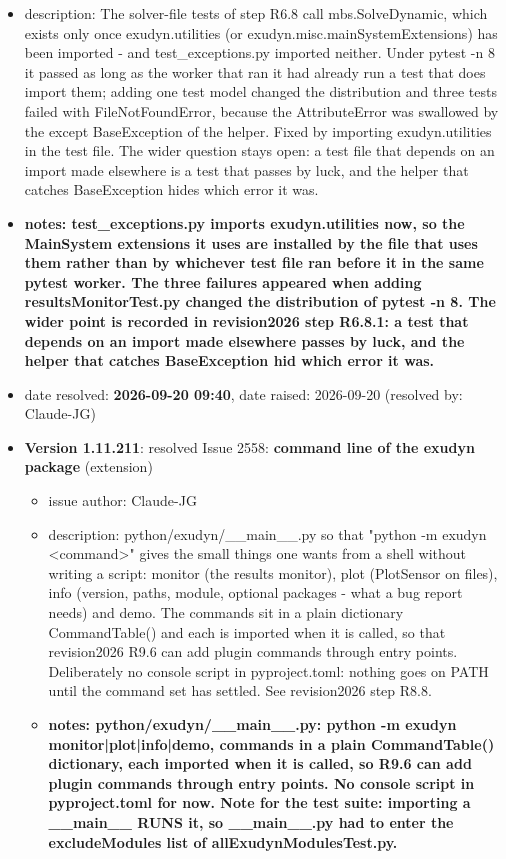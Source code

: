 \begin{itemize}
\begin{itemize}
\begin{itemize}
\begin{itemize}
\begin{itemize}
\begin{itemize}
\begin{itemize}
\begin{itemize}
\begin{itemize}
\begin{itemize}
    \item {description: The solver-file tests of step R6.8 call mbs.SolveDynamic, which exists only once exudyn.utilities (or exudyn.misc.mainSystemExtensions) has been imported - and test\_exceptions.py imported neither. Under pytest -n 8 it passed as long as the worker that ran it had already run a test that does import them; adding one test model changed the distribution and three tests failed with FileNotFoundError, because the AttributeError was swallowed by the except BaseException of the helper. Fixed by importing exudyn.utilities in the test file. The wider question stays open: a test file that depends on an import made elsewhere is a test that passes by luck, and the helper that catches BaseException hides which error it was.}
    \item {\bf notes: test\_exceptions.py imports exudyn.utilities now, so the MainSystem extensions it uses are installed by the file that uses them rather than by whichever test file ran before it in the same pytest worker. The three failures appeared when adding resultsMonitorTest.py changed the distribution of pytest -n 8. The wider point is recorded in revision2026 step R6.8.1: a test that depends on an import made elsewhere passes by luck, and the helper that catches BaseException hid which error it was.}
    \item   date resolved: {\bf 2026-09-20 09:40},
date raised: 2026-09-20 (resolved by: Claude-JG)
  \ei
  \item[] {\bf Version 1.11.211}:  resolved Issue 2558: {\bf command line of the exudyn package}
(extension)
\vspace{-6pt}   \begin{itemize} \setlength\itemsep{-1pt}
    \item issue author: Claude-JG
    \item {description: python/exudyn/\_\_main\_\_.py so that "python -m exudyn <command>" gives the small things one wants from a shell without writing a script: monitor (the results monitor), plot (PlotSensor on files), info (version, paths, module, optional packages - what a bug report needs) and demo. The commands sit in a plain dictionary CommandTable() and each is imported when it is called, so that revision2026 R9.6 can add plugin commands through entry points. Deliberately no console script in pyproject.toml: nothing goes on PATH until the command set has settled. See revision2026 step R8.8.}
    \item {\bf notes: python/exudyn/\_\_main\_\_.py: python -m exudyn monitor|plot|info|demo, commands in a plain CommandTable() dictionary, each imported when it is called, so R9.6 can add plugin commands through entry points. No console script in pyproject.toml for now. Note for the test suite: importing a \_\_main\_\_ RUNS it, so \_\_main\_\_.py had to enter the excludeModules list of allExudynModulesTest.py.}

\end{itemize}
\end{itemize}
\end{itemize}
\end{itemize}
\end{itemize}
\end{itemize}
\end{itemize}
\end{itemize}
\end{itemize}
\end{itemize}
\end{itemize}
